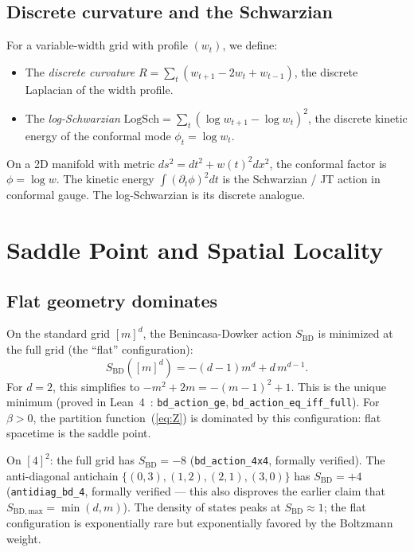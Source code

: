 \documentclass[aps,prd,twocolumn,superscriptaddress]{revtex4-2}
\begin{document}
\subsection{Discrete curvature and the Schwarzian}

For a variable-width grid with profile $(w_t)$, we define:
\begin{itemize}
\item The \emph{discrete curvature}
$R = \sum_{t} (w_{t+1} - 2w_t + w_{t-1})$, the discrete Laplacian
of the width profile.
\item The \emph{log-Schwarzian}
$\mathrm{LogSch} = \sum_t (\log w_{t+1} - \log w_t)^2$, the
discrete kinetic energy of the conformal mode $\phi_t = \log w_t$.
\end{itemize}

On a 2D manifold with metric $ds^2 = dt^2 + w(t)^2 dx^2$, the
conformal factor is $\phi = \log w$. The kinetic energy
$\int (\partial_t \phi)^2 dt$ is the Schwarzian / JT action in
conformal gauge. The log-Schwarzian is its discrete analogue.


\section{Saddle Point and Spatial Locality}

\subsection{Flat geometry dominates}

On the standard grid $[m]^d$, the Benincasa-Dowker action
$S_{\mathrm{BD}}$ is minimized at the full grid (the ``flat''
configuration):
\begin{equation}
S_{\mathrm{BD}}([m]^d) = -(d{-}1)m^d + d\,m^{d-1}.
\end{equation}
For $d = 2$, this simplifies to $-m^2 + 2m = -(m{-}1)^2 + 1$.
This is the unique minimum (proved in Lean~4~\cite{leanrepo}:
\texttt{bd\_action\_ge}, \texttt{bd\_action\_eq\_iff\_full}).
For $\beta > 0$, the partition
function~(\ref{eq:Z}) is dominated by this configuration: flat
spacetime is the saddle point.

On $[4]^2$: the full grid has $S_{\mathrm{BD}} = -8$
(\texttt{bd\_action\_4x4}, formally verified). The anti-diagonal antichain
$\{(0,3),(1,2),(2,1),(3,0)\}$ has $S_{\mathrm{BD}} = +4$
(\texttt{antidiag\_bd\_4}, formally verified --- this also
disproves the earlier claim that $S_{\mathrm{BD,max}} = \min(d,m)$).
The density of states peaks at $S_{\mathrm{BD}} \approx 1$;
the flat configuration is exponentially rare but exponentially
favored by the Boltzmann weight.
\end{document}
